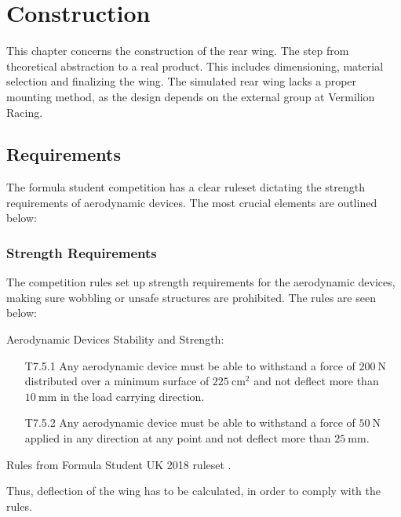 \chapter{Construction}
\label{chap:construction}

  This chapter concerns the construction of the rear wing. The step from theoretical abstraction to a real product. This includes dimensioning, material selection and finalizing the wing. The simulated rear wing lacks a proper mounting method, as the design depends on the external group at Vermilion Racing.

\section{Requirements}

  The formula student competition has a clear ruleset dictating the strength requirements of aerodynamic devices. The most crucial elements are outlined below:

  \subsection{Strength Requirements}

    The competition rules set up strength requirements for the aerodynamic devices, making sure wobbling or unsafe structures are prohibited. The rules are seen below:

    \begin{tcolorbox}[colframe=seapurple,colback=seapurple!1]
      Aerodynamic Devices Stability and Strength:
      \begin{itemize}
        \item [T7.5.1] Any aerodynamic device must be able to withstand a force of $\SI{200}{\newton}$ distributed over a minimum surface of $\SI{225}{\centi\metre\squared}$ and not deflect more than $\SI{10}{\milli\metre}$ in the load carrying direction.
        \item [T7.5.2] Any aerodynamic device must be able to withstand a force of $\SI{50}{\newton}$ applied in any direction at any point and not deflect more than $\SI{25}{\milli\metre}$.
      \end{itemize}
      \vspace{5pt}
      \hspace*{\fill}\tiny{Rules from Formula Student UK 2018 ruleset \cite{FSrules18}.}
    \end{tcolorbox}

    Thus, deflection of the wing has to be calculated, in order to comply with the rules.

